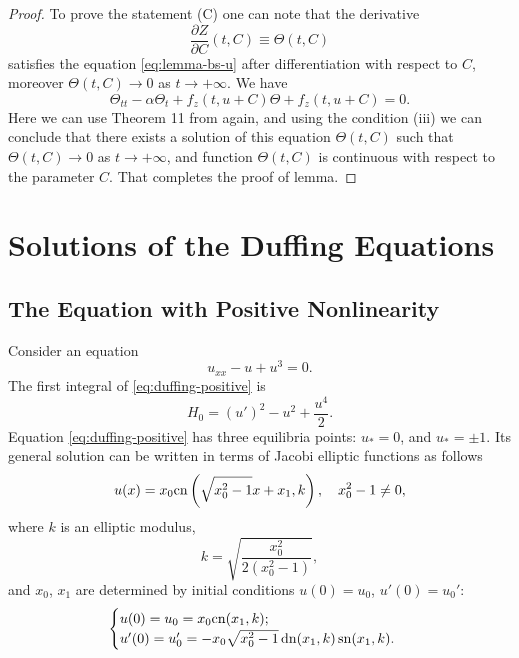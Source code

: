 \begin{proof}
	To prove the statement (C) one can note that the derivative
	\begin{equation}
		\dfrac{\partial Z}{\partial C}(t, C) \equiv \Theta(t, C)
	\end{equation}
	satisfies the equation \eqref{eq:lemma-bs-u} after differentiation with respect to $C$, moreover $\Theta(t, C) \to 0$ as $t \to +\infty$.
	We have
	\begin{equation}
		\Theta_{tt} - \alpha \Theta_t + f_z(t, u + C) \Theta + f_z(t, u + C) = 0.
	\end{equation}
	Here we can use Theorem 11 from \cite[Chapter 3]{Coppel} again, and using the condition (iii) we can conclude that there exists a solution of this equation $\Theta(t, C)$ such that $\Theta(t, C) \to 0$ as $t \to +\infty$, and function $\Theta(t, C)$ is continuous with respect to the parameter $C$.
	That completes the proof of lemma.
\end{proof}

\chapter{Solutions of the Duffing Equations}
\label{appendix:solutions-of-duffing-equations}

\section{The Equation with Positive Nonlinearity}

Consider an equation
\begin{equation}
	u_{xx} - u + u^3 = 0.
\label{eq:duffing-positive}
\end{equation}
The first integral of \eqref{eq:duffing-positive} is
\begin{equation}
	H_0 = (u')^2 - u^2 + \frac{u^4}{2}.
\end{equation}
Equation \eqref{eq:duffing-positive} has three equilibria points: $u_* = 0$, and $u_* = \pm 1$.
Its general solution can be written in terms of Jacobi elliptic functions as follows
\begin{equation}
	u(x) = x_0 \mathrm{cn} \left( \sqrt{x_0^2 - 1} x + x_1, k \right), \quad x_0^2 - 1 \neq 0,
\label{eq:duffing-positive-solution}
\end{equation}
where $k$ is an elliptic modulus,
\begin{equation}
	k = \sqrt{\frac{x_0^2}{2(x_0^2 - 1)}},
\end{equation}
and $x_0$, $x_1$ are determined by initial conditions $u(0) = u_0$, $u'(0) = u_0'$:
\begin{equation}
\begin{cases}
	u(0) = u_0 = x_0 \mathrm{cn} (x_1, k); \\
	u'(0) = u_0' = -x_0 \sqrt{x_0^2 - 1} \mathop\mathrm{dn} (x_1, k) \mathop\mathrm{sn} (x_1, k).
\end{cases}
\end{equation}

